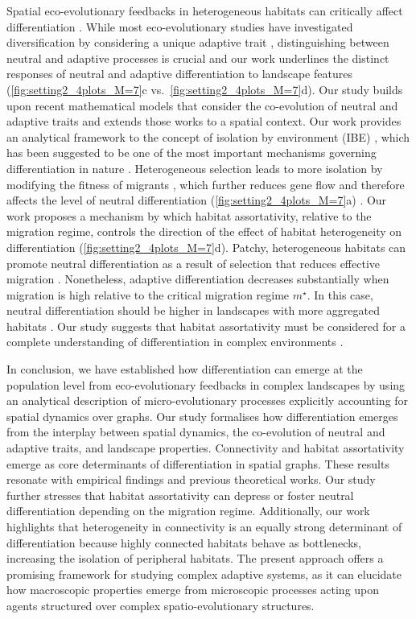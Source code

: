Spatial eco-evolutionary feedbacks in heterogeneous habitats can critically affect differentiation \cite{Richardson2014}.
%
While most eco-evolutionary studies have investigated diversification by considering a unique adaptive trait \cite{Doebeli2003,Kirkpatrick1997,Polechova2015,Polechova2018}, distinguishing between neutral and adaptive processes is crucial \cite{Holderegger2006} and our work underlines the distinct responses of neutral and adaptive differentiation to landscape features (\cref{fig:setting2_4plots_M=7}c vs.\ \cref{fig:setting2_4plots_M=7}d).
%
Our study builds upon recent mathematical models that consider the co-evolution of neutral and adaptive traits \cite{Billiard2015,Anceschi2019} and extends those works to a spatial context. Our work provides an analytical framework to the concept of isolation by environment (IBE) \cite{Orsini2013}, which has been suggested to be one of the most important mechanisms governing differentiation in nature \cite{Wang2014}.
%
Heterogeneous selection leads to more isolation by modifying the fitness of migrants \cite{Polechova2018}, which further reduces gene flow \cite{Richardson2014} and therefore affects the level of neutral differentiation (\cref{fig:setting2_4plots_M=7}a) \cite{GARANT2007}.
%
Our work proposes a mechanism by which habitat assortativity, relative to the migration regime, controls the direction of the effect of habitat heterogeneity on differentiation (\cref{fig:setting2_4plots_M=7}d).
%
Patchy, heterogeneous habitats can promote neutral differentiation as a result of selection that reduces effective migration \cite{Stein2014}. Nonetheless, adaptive differentiation decreases substantially when migration is high relative to the critical migration regime $m^\star$. In this case, neutral differentiation should be higher in landscapes with more aggregated habitats \cite{Richardson2014}.
%
Our study suggests that habitat assortativity must be considered for a complete understanding of differentiation in complex environments \cite{Stein2014}. 

In conclusion, we have established how differentiation can emerge at the population level from eco-evolutionary feedbacks in complex landscapes by using an analytical description of micro-evolutionary processes explicitly accounting for spatial dynamics over graphs.
%
Our study formalises how differentiation emerges from the interplay between spatial dynamics, the co-evolution of neutral and adaptive traits, and landscape properties.
%
Connectivity and habitat assortativity emerge as core determinants of differentiation in spatial graphs. These results resonate with empirical findings and previous theoretical works. Our study further stresses that habitat assortativity can depress or foster neutral differentiation depending on the migration regime.
%
Additionally, our work highlights that heterogeneity in connectivity is an equally strong determinant of differentiation because highly connected habitats behave as bottlenecks, increasing the isolation of peripheral habitats.
%
The present approach offers a promising framework for studying complex adaptive systems, as it can elucidate how macroscopic properties emerge from microscopic processes acting upon agents structured over complex spatio-evolutionary structures.

